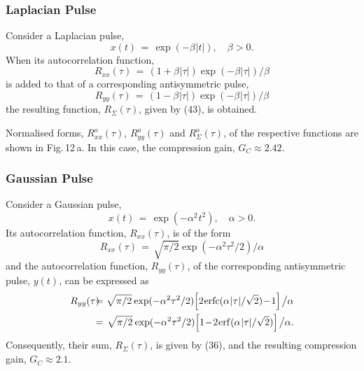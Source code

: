 \documentclass[journal]{IEEEtran}
\begin{document}
\subsubsection{Laplacian Pulse}
Consider a Laplacian pulse, 
\begin{equation}
	 x(t) \,= \,\exp(-\beta\mspace{1mu}|t|), \quad \beta > 0.
\end{equation}
When its autocorrelation function,
\begin{equation}
	R_{xx}(\tau) \,= \,(1+\beta \mspace{1mu}|\tau|)\exp(-\beta\mspace{1mu}|\tau|)/\beta
\end{equation}
is added to that of a corresponding antisymmetric pulse, 
\begin{equation}
	R_{yy}(\tau) \,= \,(1-\beta \mspace{1mu}|\tau|)\exp(-\beta\mspace{1mu}|\tau|)/\beta
\end{equation}
the resulting function, $R_\Sigma(\tau)$, given by (43), is obtained.

Normalised forms, $R^o_{xx}(\tau)$, $R^o_{yy}(\tau)$ and $R^o_\Sigma(\tau)$, of the respective functions are shown in Fig.\,12\,a. 
In this case, the compression gain, $G_C \approx 2.42$.

\vspace{0.05cm}
\subsubsection{Gaussian Pulse}
Consider a Gaussian pulse,
\begin{equation}
	x(t) \,= \,\exp(-\alpha^2\mspace{1mu} t^2), \quad \alpha > 0 .
\end{equation}
Its autocorrelation function, $R_{xx}(\tau)$, is of the form
\begin{equation}
	R_{xx}(\tau) \,= \,\sqrt{\pi/2} \exp(-\alpha^2 \tau^2/2)/\alpha
\end{equation}
and the autocorrelation function, $R_{yy}(\tau)$, of the corresponding antisymmetric pulse, $y(t)$, can be expressed as
\begin{eqnarray}
	R_{yy}(\tau) \!\!&\!\!=\!\!&\!\!  
	\sqrt{\pi/2}\mspace{1mu} \exp(-\alpha^2 \tau^2/2)\mspace{-3mu}
	\left[2\mspace{1mu}\mathrm{erfc}(\alpha\mspace{1mu} |\tau|/\sqrt{2})\!-\!1\right]\mspace{-1mu}
	\big/\alpha 	\nonumber \\
	&\!\!=\!\!&\!\! 
	\sqrt{\pi/2}\mspace{1mu} \exp(-\alpha^2 \tau^2/2)\mspace{-3mu}
	\left[1\!-\!2\mspace{1mu}\mathrm{erf}(\alpha\mspace{1mu} |\tau|/\sqrt{2})\right]\mspace{-1mu}
	\big/\alpha. \nonumber  
\end{eqnarray}
Consequently, their sum, $R_\Sigma(\tau)$, is given by (36), and the resulting compression gain, $G_C \approx 2.1$.
\end{document}
